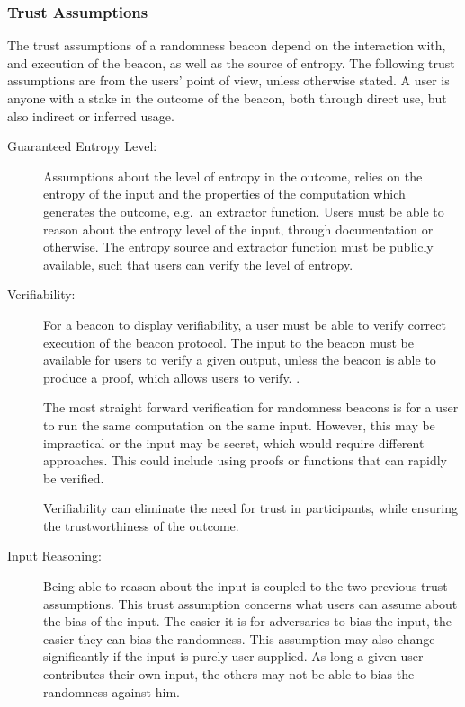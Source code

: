 \subsubsection{Trust Assumptions}\label{ssub:trust_assumptions}
The trust assumptions of a randomness beacon depend on the interaction with, and execution of the beacon, as well as the source of entropy.
The following trust assumptions are from the users' point of view, unless otherwise stated.
A user is anyone with a stake in the outcome of the beacon, both through direct use, but also indirect or inferred usage.
\begin{description}

    \item[Guaranteed Entropy Level:]
        Assumptions about the level of entropy in the outcome, relies on the entropy of the input and the properties of the computation which generates the outcome, e.g.\ an extractor function.
        Users must be able to reason about the entropy level of the input, through documentation or otherwise.
        The entropy source and extractor function must be publicly available, such that users can verify the level of entropy.

    \item[Verifiability:]
        For a beacon to display verifiability, a user must be able to verify correct execution of the beacon protocol.
        The input to the beacon must be available for users to verify a given output, unless the beacon is able to produce a proof, which allows users to verify. .

        The most straight forward verification for randomness beacons is for a user to run the same computation on the same input. However, this may be impractical or the input may be secret, which would require different approaches. This could include using proofs or functions that can rapidly be verified.

        Verifiability can eliminate the need for trust in participants, while ensuring the trustworthiness of the outcome.

    \item[Input Reasoning:]
        Being able to reason about the input is coupled to the two previous trust assumptions. This trust assumption concerns what users can assume about the bias of the input.
        The easier it is for adversaries to bias the input, the easier they can bias the randomness.
        This assumption may also change significantly if the input is purely user-supplied. As long a given user contributes their own input, the others may not be able to bias the randomness against him.

\end{description}


